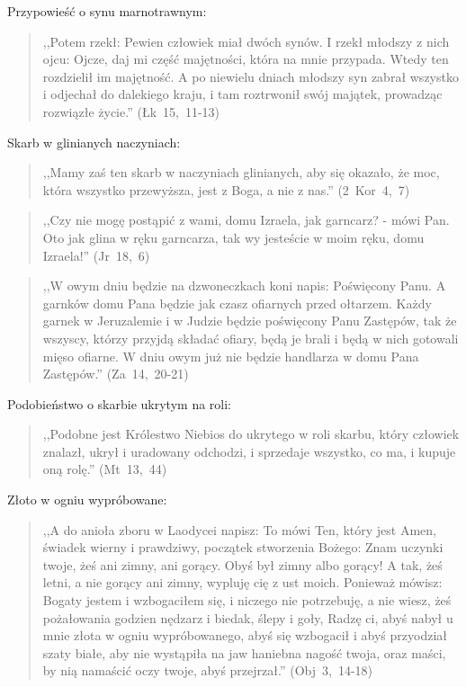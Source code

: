 \documentclass[10pt,a4paper,oneside]{article}
\begin{document}
Przypowieść o synu marnotrawnym:
\begin{quote}
,,Potem rzekł: Pewien człowiek miał dwóch synów. I rzekł młodszy z nich ojcu: Ojcze, daj mi część majętności, która na mnie przypada. Wtedy ten rozdzielił im majętność. A po niewielu dniach młodszy syn zabrał wszystko i odjechał do dalekiego kraju, i tam roztrwonił swój majątek, prowadząc rozwiązłe życie.'' (Łk~15,~11-13)
\end{quote}

Skarb w glinianych naczyniach:
\begin{quote}
,,Mamy zaś ten skarb w naczyniach glinianych, aby się okazało, że moc, która wszystko przewyższa, jest z Boga, a nie z nas.'' (2~Kor~4,~7)
\end{quote}
\begin{quote}
,,Czy nie mogę postąpić z wami, domu Izraela, jak garncarz? - mówi Pan. Oto jak glina w ręku garncarza, tak wy jesteście w moim ręku, domu Izraela!'' (Jr~18,~6)
\end{quote}
\begin{quote}
,,W owym dniu będzie na dzwoneczkach koni napis: Poświęcony Panu. A garnków domu Pana będzie jak czasz ofiarnych przed ołtarzem. Każdy garnek w Jeruzalemie i w Judzie będzie poświęcony Panu Zastępów, tak że wszyscy, którzy przyjdą składać ofiary, będą je brali i będą w nich gotowali mięso ofiarne. W dniu owym już nie będzie handlarza w domu Pana Zastępów.'' (Za~14,~20-21)
\end{quote}

Podobieństwo o skarbie ukrytym na roli:
\begin{quote}
,,Podobne jest Królestwo Niebios do ukrytego w roli skarbu, który człowiek znalazł, ukrył i uradowany odchodzi, i sprzedaje wszystko, co ma, i kupuje oną rolę.'' (Mt~13,~44)
\end{quote}

Złoto w ogniu wypróbowane:
\begin{quote}
,,A do anioła zboru w Laodycei napisz: To mówi Ten, który jest Amen, świadek wierny i prawdziwy, początek stworzenia Bożego: Znam uczynki twoje, żeś ani zimny, ani gorący. Obyś był zimny albo gorący! A tak, żeś letni, a nie gorący ani zimny, wypluję cię z ust moich. Ponieważ mówisz: Bogaty jestem i wzbogaciłem się, i niczego nie potrzebuję, a nie wiesz, żeś pożałowania godzien nędzarz i biedak, ślepy i goły, Radzę ci, abyś nabył u mnie złota w ogniu wypróbowanego, abyś się wzbogacił i abyś przyodział szaty białe, aby nie wystąpiła na jaw haniebna nagość twoja, oraz maści, by nią namaścić oczy twoje, abyś przejrzał.'' (Obj~3,~14-18)
\end{quote}
\end{document}
